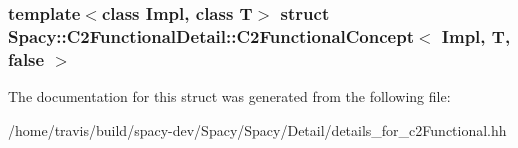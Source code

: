 \subsubsection*{template$<$class Impl, class T$>$ struct Spacy\-::\-C2\-Functional\-Detail\-::\-C2\-Functional\-Concept$<$ Impl, T, false $>$}



\-The documentation for this struct was generated from the following file\-:\begin{DoxyCompactItemize}
\item 
/home/travis/build/spacy-\/dev/\-Spacy/\-Spacy/\-Detail/details\-\_\-for\-\_\-c2\-Functional.\-hh\end{DoxyCompactItemize}
